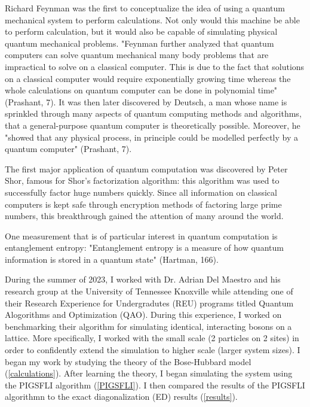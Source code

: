

Richard Feynman was the first to conceptualize the idea of using a quantum mechanical system to perform calculations. Not only would this machine be able to perform calculation, but it would also be capable of simulating physical quantum mechanical problems. "Feynman further analyzed that quantum computers can solve quantum mechanical many body problems that are impractical to solve on a classical computer. This is due to the fact that solutions on a classical computer would require exponentially growing time whereas the whole calculations on quantum computer can be done in polynomial time" (Prashant, 7). It was then later discovered by Deutsch, a man whose name is sprinkled through many aspects of quantum computing methods and algorithms, that a general-purpose quantum computer is theoretically possible. Moreover, he "showed that any physical process, in principle could be modelled perfectly by a quantum computer" (Prashant, 7).

The first major application of quantum computation was discovered by Peter Shor, famous for Shor's factorization algorithm: this algorithm was used to successfully factor huge numbers quickly. Since all information on classical computers is kept safe through encryption methods of factoring large prime numbers, this breakthrough gained the attention of many around the world.

One measurement that is of particular interest in quantum computation is entanglement entropy: "Entanglement entropy is a measure of how quantum information is stored in a quantum state" (Hartman, 166).

During the summer of 2023, I worked with Dr. Adrian Del Maestro and his research group at the University of Tennessee Knoxville while attending one of their Research Experience for Undergradutes (REU) programs titled Quantum Alogorithms and Optimization (QAO). During this experience, I worked on benchmarking their algorithm for simulating identical, interacting bosons on a lattice. More specifically, I worked with the small scale (2 particles on 2 sites) in order to confidently extend the simulation to higher scale (larger system sizes). I began my work by studying the theory of the Bose-Hubbard model (\cref*{calculations}). After learning the theory, I began simulating the system using the PIGSFLI algorithm (\cref*{PIGSFLI}). I then compared the results of the PIGSFLI algorithmn to the exact diagonalization (ED) results (\cref*{results}). 


